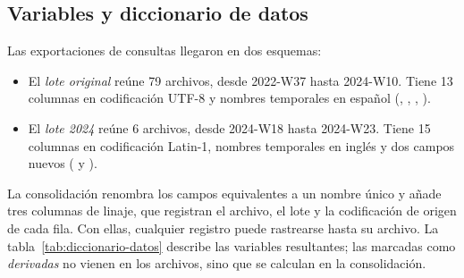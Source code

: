 \subsection{Variables y diccionario de datos}
\label{sec:diccionario-datos}

Las exportaciones de consultas llegaron en dos esquemas:
\begin{itemize}
  \item El \emph{lote original} reúne 79 archivos, desde 2022-W37 hasta 2024-W10. Tiene 13
        columnas en codificación UTF-8 y nombres temporales en español (,
        , , ).
  \item El \emph{lote 2024} reúne 6 archivos, desde 2024-W18 hasta 2024-W23. Tiene 15
        columnas en codificación Latin-1, nombres temporales en inglés y dos campos nuevos
        ( y ).
\end{itemize}
La consolidación renombra los campos equivalentes a un nombre único y añade tres columnas
de linaje, que registran el archivo, el lote y la codificación de origen de cada fila. Con
ellas, cualquier registro puede rastrearse hasta su archivo. La
tabla~\ref{tab:diccionario-datos} describe las variables resultantes; las marcadas como
\emph{derivadas} no vienen en los archivos, sino que se calculan en la consolidación.

